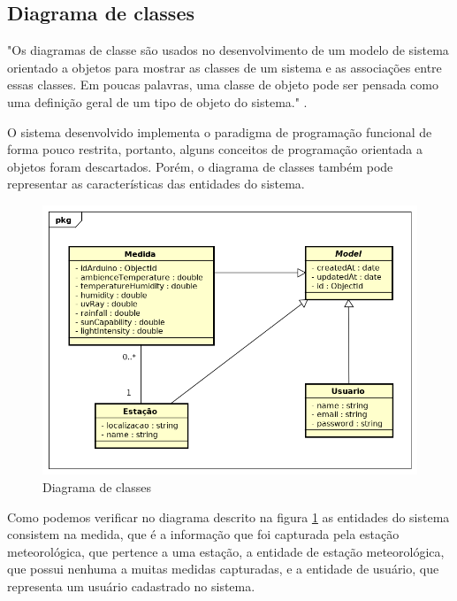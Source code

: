 \subsection{Diagrama de classes}

"Os diagramas de classe são usados no desenvolvimento de um modelo de sistema orientado a objetos para mostrar as classes de um sistema e as associações entre essas classes. Em poucas palavras, uma classe de objeto pode ser pensada como uma definição geral de um tipo de objeto do sistema." \cite{engenharia_software_sommerville}.

O sistema desenvolvido implementa o paradigma de programação funcional de forma pouco restrita, portanto, alguns conceitos de programação orientada a objetos foram descartados. Porém, o diagrama de classes também pode representar as características das entidades do sistema.

\begin{center}
\begin{figure}[H]
    \centering
    \caption{Diagrama de classes \label{fig:figure_diagrama_classe}}
    \includegraphics[scale=0.8]{diagrams/classe.png}
    \hfill
{}
\end{figure}
\end{center}

Como podemos verificar no diagrama descrito na figura \ref{fig:figure_diagrama_classe} as entidades do sistema consistem na medida, que é a informação que foi capturada pela estação meteorológica, que pertence a uma estação, a entidade de estação meteorológica, que possui nenhuma a muitas medidas capturadas, e a entidade de usuário, que representa um usuário cadastrado no sistema.


